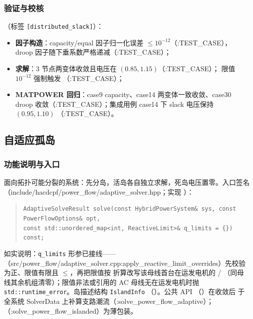 \subsubsection*{验证与校核}
（标签 \texttt{[distributed\_slack]}）：
\begin{itemize}
  \item \textbf{因子构造}：capacity/equal 因子归一化误差 $\le10^{-12}$（:TEST\_CASE），
        droop 因子随下垂系数严格递减（:TEST\_CASE）；
  \item \textbf{求解}：3 节点两变体收敛且电压在 $(0.85,1.15)$（:TEST\_CASE）；
        限值 $10^{-12}$ 强制触发 （:TEST\_CASE）；
  \item \textbf{MATPOWER 回归}：case9 capacity、case14 两变体一致收敛、case30 droop
        收敛（:TEST\_CASE）；集成用例 case14 下 slack 电压保持 $(0.95,1.10)$
        （:TEST\_CASE）。
\end{itemize}

\subsection{自适应孤岛}


\subsubsection*{功能说明与入口}
面向拓扑可能分裂的系统：先分岛，活岛各自独立求解，死岛电压置零。入口签名
（include/hacdcpf/power\_flow/adaptive\_solver.hpp；实现 ）：
\begin{quote}\footnotesize
\texttt{AdaptiveSolveResult solve(const HybridPowerSystem\& sys, const PowerFlowOptions\& opt,\\
\hspace*{2em}const std::unordered\_map<int, ReactiveLimit>\& q\_limits = \{\}) const;}
\end{quote}
如实说明：\texttt{q\_limits} 形参已接线——
（src/power\_flow/adaptive\_solver.cpp:apply\_reactive\_limit\_overrides）先校验
 为正、限值有限且 $\le$，再把限值按
 折算改写该母线首台在运发电机的 /
（同母线其余机组清零）；限值非法或引用的 AC 母线无在运发电机时抛
\texttt{std::runtime\_error}。岛描述结构 \texttt{IslandInfo}
（）。公共 API
（）在收敛后
于全系统 SolverData 上补算支路潮流（:solve\_power\_flow\_adaptive）；
（:solve\_power\_flow\_islanded）为薄包装。

